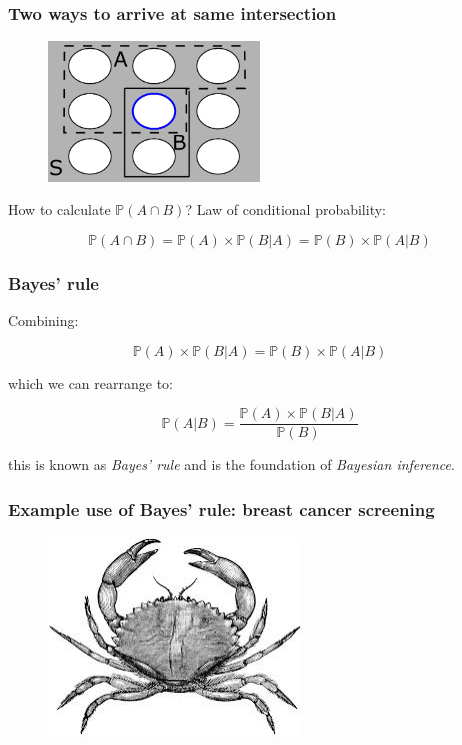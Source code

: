 \documentclass{beamer}
\begin{document}
	\begin{frame}
		\frametitle{Two ways to arrive at same intersection}
		
		\begin{figure}[ht]
			\centerline{\includegraphics[width=0.5\textwidth]{./figures/pebble_world_and.png}}
		\end{figure}
		
		How to calculate $\mathbb{P}(A \cap B)$? Law of conditional probability:
		
		\begin{equation}
			\mathbb{P}(A \cap B) = \mathbb{P}(A) \times \mathbb{P}(B|A) = \mathbb{P}(B) \times \mathbb{P}(A|B)
		\end{equation}
		
	\end{frame}
	
	\begin{frame}
		\frametitle{Bayes' rule}
		
		Combining:
		
		\begin{equation}
		\mathbb{P}(A) \times \mathbb{P}(B|A) = \mathbb{P}(B) \times \mathbb{P}(A|B)
		\end{equation}
		
		which we can rearrange to:
		
		\begin{equation}
		\mathbb{P}(A|B) = \frac{\mathbb{P}(A) \times \mathbb{P}(B|A)}{\mathbb{P}(B)}
		\end{equation}
		
		this is known as \textit{Bayes' rule} and is the foundation of \textit{Bayesian inference}.
		
	\end{frame}
	
	\begin{frame}
		\frametitle{Example use of Bayes' rule: breast cancer screening}
		
		\begin{figure}[ht]
			\includegraphics[width=0.6\textwidth]{./figures/crab2.jpeg}
		\end{figure}
	\end{frame}
	
\end{document}
